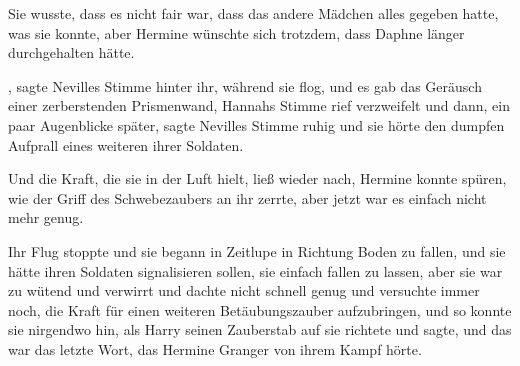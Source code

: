 Sie wusste, dass es nicht fair war, dass das andere Mädchen alles gegeben hatte, was sie konnte, aber Hermine wünschte sich trotzdem, dass Daphne länger durchgehalten hätte.

, sagte Nevilles Stimme hinter ihr, während sie flog, und es gab das Geräusch einer zerberstenden Prismenwand, Hannahs Stimme rief verzweifelt  und dann, ein paar Augenblicke später, sagte Nevilles Stimme ruhig  und sie hörte den dumpfen Aufprall eines weiteren ihrer Soldaten.

Und die Kraft, die sie in der Luft hielt, ließ wieder nach, Hermine konnte spüren, wie der Griff des Schwebezaubers an ihr zerrte, aber jetzt war es einfach nicht mehr genug.

Ihr Flug stoppte und sie begann in Zeitlupe in Richtung Boden zu fallen, und sie hätte ihren Soldaten signalisieren sollen, sie einfach fallen zu lassen, aber sie war zu wütend und verwirrt und dachte nicht schnell genug und versuchte immer noch, die Kraft für einen weiteren Betäubungszauber aufzubringen, und so konnte sie nirgendwo hin, als Harry seinen Zauberstab auf sie richtete und  sagte, und das war das letzte Wort, das Hermine Granger von ihrem Kampf hörte.

